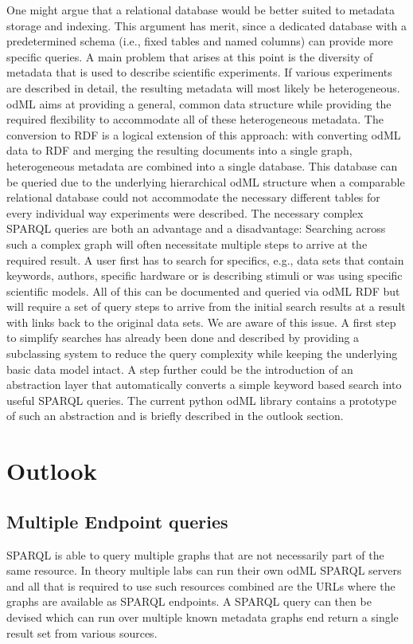 \documentclass{article}
\begin{document}
One might argue that a relational database would be better suited to metadata storage and indexing. This argument has merit, since a dedicated database with a predetermined schema (i.e., fixed tables and named columns) can provide more specific queries.
A main problem that arises at this point is the diversity of metadata that is used to describe scientific experiments. If various experiments are described in detail, the resulting metadata will most likely be heterogeneous. odML aims at providing a general, common data structure while providing the required flexibility to accommodate all of these heterogeneous metadata. The conversion to RDF is a logical extension of this approach: with converting odML data to RDF and merging the resulting documents into a single graph, heterogeneous metadata are combined into a single database. This database can be queried due to the underlying hierarchical odML structure when a comparable relational database could not accommodate the necessary different tables for every individual way experiments were described.
The necessary complex SPARQL queries are both an advantage and a disadvantage: Searching across such a complex graph will often necessitate multiple steps to arrive at the required result. A user first has to search for specifics, e.g., data sets that contain keywords, authors, specific hardware or is describing stimuli or was using specific scientific models. All of this can be documented and queried via odML RDF but will require a set of query steps to arrive from the initial search results at a result with links back to the original data sets.
We are aware of this issue. A first step to simplify searches has already been done and described by providing a subclassing system to reduce the query complexity while keeping the underlying basic data model intact. A step further could be the introduction of an abstraction layer that automatically converts a simple keyword based search into useful SPARQL queries. The current python odML library contains a prototype of such an abstraction and is briefly described in the outlook section.

\section{Outlook} \label{sec:outlook}
\subsection{Multiple Endpoint queries} \label{sec:outlook_endpoints}
SPARQL is able to query multiple graphs that are not necessarily part of the same resource. In theory multiple labs can run their own odML SPARQL servers and all that is required to use such resources combined are the URLs where the graphs are available as SPARQL endpoints. A SPARQL query can then be devised which can run over multiple known metadata graphs end return a single result set from various sources.
\end{document}

